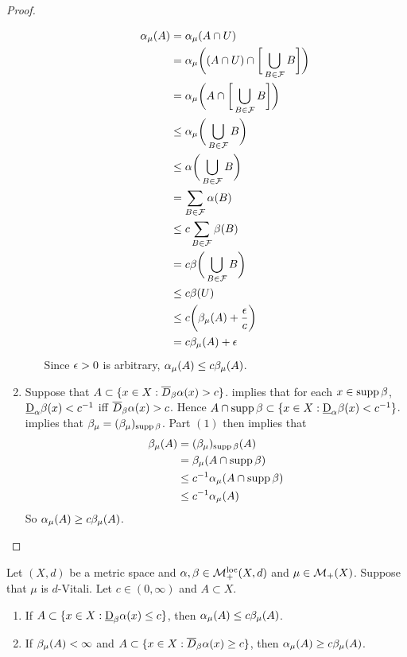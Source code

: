 \documentclass{book}
\begin{document}
\begin{proof}
\begin{enumerate}
\begin{itemize}
				\begin{align*}
					\alpha_{\mu}(A)
					& = \alpha_{\mu}(A \cap U) \\
					& = \alpha_{\mu} \bigg((A \cap U) \cap \bigg[ \bigcup_{B \in \mathcal{F}} B \bigg] \bigg) \\
					& = \alpha_{\mu} \bigg(A \cap \bigg[ \bigcup_{B \in \mathcal{F}} B \bigg] \bigg) \\
					& \leq \alpha_{\mu}  \bigg( \bigcup_{B \in \mathcal{F}} B \bigg) \\
					& \leq \alpha \bigg( \bigcup_{B \in \mathcal{F}} B \bigg) \\
					& = \sum_{B \in \mathcal{F}} \alpha(B) \\
					& \leq c \sum_{B \in \mathcal{F}} \beta(B) \\
					& = c \beta \bigg( \bigcup_{B \in \mathcal{F}} B \bigg) \\
					& \leq c \beta(U) \\
					& \leq c \bigg(  \beta_{\mu}(A) + \frac{\epsilon}{c} \bigg)  \\
					& = c \beta_{\mu}(A) + \epsilon 
				\end{align*}
				Since $\epsilon > 0$ is arbitrary, $\alpha_{\mu}(A) \leq c \beta_{\mu}(A)$.
			\end{itemize}
			\item Suppose that $A \subset \{x \in X: \overline{D}_{\beta}\alpha(x) > c\}$.  implies that for each $x \in \operatorname{supp} \beta$, $\underbar{D}_{\alpha} \beta (x) < c^{-1}$ iff $\overline{D}_{\beta}\alpha(x) > c$. Hence $A \cap \operatorname{supp} \beta \subset \{x \in X: \underbar{D}_{\alpha}\beta(x) < c^{-1}\}$.  implies that $\beta_{\mu} = (\beta_{\mu})_{\operatorname{supp} \beta}$. Part $(1)$ then implies that
			\begin{align*}
				\beta_{\mu}(A)
				& = (\beta_{\mu})_{\operatorname{supp} \beta} (A) \\
				& = \beta_{\mu}(A \cap \operatorname{supp} \beta) \\
				& \leq c^{-1} \alpha_{\mu}(A \cap \operatorname{supp} \beta) \\
				& \leq c^{-1} \alpha_{\mu}(A) 
			\end{align*}
			So $\alpha_{\mu}(A) \geq c \beta_{\mu}(A)$. 
		\end{enumerate}
	\end{proof}

		\begin{ex} 
		Let $(X, d)$ be a metric space and $\alpha, \beta \in \mathcal{M}_+^{\text{loc}}(X, d)$ and $\mu \in \mathcal{M}_+(X)$. Suppose that $\mu$ is $d$-Vitali. Let $c \in (0,\infty)$ and $A \subset X$. 
		\begin{enumerate}
			\item If $A \subset \{x \in X: \underbar{D}_{\beta}\alpha(x) \leq c\}$, then $\alpha_{\mu}(A) \leq c \beta_{\mu}(A)$.
			\item If $\beta_{\mu}(A) < \infty$ and $A \subset \{x \in X: \overline{D}_{\beta}\alpha(x) \geq c\}$, then $\alpha_{\mu}(A) \geq c \beta_{\mu}(A)$. 
		\end{enumerate}
	\end{ex}
	
\end{document}
